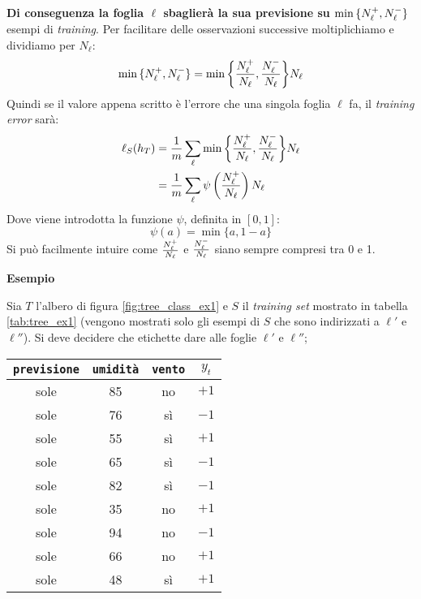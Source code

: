 \textbf{Di conseguenza la foglia $\ell$ sbaglierà la sua previsione su
$\min{\{\ensuremath{N_{\ell}^+},\ensuremath{N_{\ell}^-}\}}$} esempi di \textit{training}. Per facilitare delle osservazioni
successive moltiplichiamo e dividiamo per $N_{\ell}$:
$$ \min{\{\ensuremath{N_{\ell}^+},\ensuremath{N_{\ell}^-}\}} = 
\min{\left\{\frac{\ensuremath{N_{\ell}^+}}{N_{\ell}},\frac{\ensuremath{N_{\ell}^-}}{N_{\ell}}\right\}}N_{\ell} $$
Quindi se il valore appena scritto è l'errore che una singola foglia $\ell$ fa, il
\textit{training error} sarà:
$$ 
\begin{aligned}
\ell_{S}(h_T)
&=\frac{1}{m}\sum_{\ell}\min{\left\{\frac{\ensuremath{N_{\ell}^+}}{N_{\ell}},\frac{\ensuremath{N_{\ell}^-}}{N_{\ell}}\right\}}N_{\ell}\\
&=\frac{1}{m}\sum_{\ell} \psi \left(\frac{N_{\ell}^+}{N_{\ell}}\right)N_{\ell}\\
\end{aligned}
$$
Dove viene introdotta la funzione $\psi$, definita in $[0,1]$:
$$\psi(a) = \min{\{a,1-a\}}$$
Si può facilmente intuire come $\frac{N_{\ell}^+}{N_{\ell}}$ e $\frac{N_{\ell}^-}{N_{\ell}}$ siano
sempre compresi tra 0 e 1.

\textbf{Esempio}

Sia $T$ l'albero di figura \ref{fig:tree_class_ex1} e $S$ il \textit{training set} mostrato
in tabella \ref{tab:tree_ex1} (vengono mostrati solo gli esempi di $S$ che sono
indirizzati a $\ell'$ e $\ell''$).
Si deve decidere che etichette dare
alle foglie $\ell'$ e $\ell''$;

\vspace{.7em}
\begin{minipage}{.49\textwidth}
    \captionsetup{type=table}
    \begin{center}
        \begin{tabular}{|c|c|c|c|} \hline
            \texttt{previsione} & \texttt{umidità} & \texttt{vento} & $y_t$ \\ \hline
            \rowcolor{orange!40}sole & 85 & no & $+1$\\
            \rowcolor{orange!40}sole & 76 & sì & $-1$\\
            \rowcolor{cyan!40}sole & 55 & sì & $+1$\\
            \rowcolor{cyan!40}sole & 65 & sì & $-1$\\
            \rowcolor{orange!40}sole & 82 & sì & $-1$\\
            \rowcolor{cyan!40}sole & 35 & no & $+1$\\
            \rowcolor{orange!40}sole & 94 & no & $-1$\\
            \rowcolor{cyan!40}sole & 66 & no & $+1$\\
            \rowcolor{cyan!40}sole & 48 & sì & $+1$\\ \hline
        \end{tabular}
    \end{center}
\end{minipage}
\begin{minipage}{.49\textwidth}
    \captionsetup{type=figure}
    \centering
    
\end{minipage}